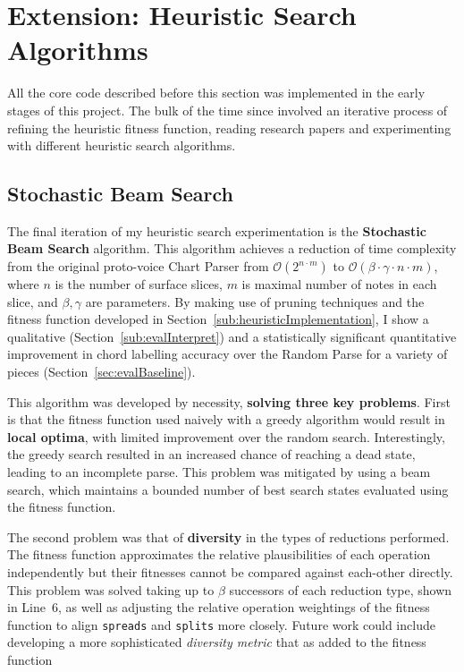 \documentclass[12pt,a4paper,twoside,openany]{report} \usepackage[pdfborder={0 0 0}]{hyperref}    %
\theoremstyle{definition} \newtheorem{definition}{Definition}[section]
\begin{document}
\section{Extension: Heuristic Search Algorithms}
\label{sec:searchImpl}

All the core code described before this section was implemented in the early stages of this project. The bulk of the
time since involved an iterative process of refining the heuristic fitness function, reading research papers and experimenting with different heuristic search algorithms. 

\subsection{Stochastic Beam Search}
\label{sub:searchImpl}

The final iteration of my heuristic search experimentation is the \textbf{Stochastic Beam Search} algorithm. This
algorithm achieves a reduction of time complexity from the original proto-voice Chart Parser from $\mathcal{O}(2^{n\cdot
m})$ to $\mathcal{O}(\beta \cdot \gamma \cdot n \cdot m)$, where $n$ is the number of surface slices, $m$ is maximal
number of notes in each slice, and $\beta,\gamma$ are parameters. By
making use of pruning techniques and the fitness function developed in Section~\ref{sub:heuristicImplementation}, I show a qualitative
(Section~\ref{sub:evalInterpret}) and a statistically significant quantitative improvement in chord labelling 
accuracy over the Random Parse for a variety of pieces (Section~\ref{sec:evalBaseline}).


This algorithm was developed by necessity, \textbf{solving three key problems}. First is that the fitness function used naively with
a greedy algorithm would result in \textbf{local optima}, with limited improvement over the random search. Interestingly, the
greedy search resulted in an increased chance of reaching a dead state, leading to an incomplete parse. This problem was
mitigated by using a beam search, which maintains a bounded number of best search states evaluated using the fitness function.

The second problem was that of \textbf{diversity} in the types of reductions performed. The fitness function approximates the
relative plausibilities of each operation independently but their fitnesses cannot be compared against each-other
directly. This problem was solved taking up to $\beta$ successors of each reduction type, shown in Line~6, as well as adjusting the
relative operation weightings of the fitness function to align \texttt{spreads} and \texttt{splits} more closely. Future
work could include developing a more sophisticated \textit{diversity metric} that as added to the fitness function 
\end{document}
